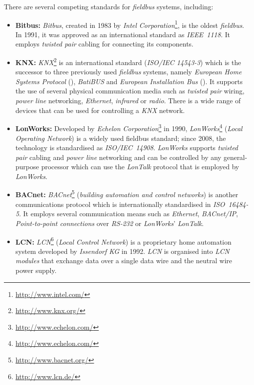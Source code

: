 There are several competing standards for \emph{fieldbus} systems, including:
\begin{itemize}
  \item \textbf{Bitbus:} \emph{Bitbus}, created in 1983 by \emph{Intel Corporation}\footnote{\href{http://www.intel.com/}{http://www.intel.com/}}, is the oldest \emph{fieldbus}. In 1991, it was approved as an international standard as \emph{IEEE~1118}\cite{IEEE1118}. It employs \emph{twisted pair} cabling for connecting its components.
  
  \item \textbf{KNX:} \emph{KNX}\footnote{\href{http://www.knx.org/}{http://www.knx.org/}} is an international standard (\emph{ISO/IEC 14543-3}\cite{knx_standard}) which is the successor to three previously used \emph{fieldbus} systems, namely \emph{European Home Systems Protocol} (), \emph{BatiBUS} and \emph{European Installation Bus} (). It supports the use of several physical communication media such as \emph{twisted pair} wiring, \emph{power line} networking, \emph{Ethernet}, \emph{infrared} or \emph{radio}. There is a wide range of devices that can be used for controlling a \emph{KNX} network.
  
  \item \textbf{LonWorks:} Developed by \emph{Echelon Corporation}\footnote{\href{http://www.echelon.com/}{http://www.echelon.com/}} in 1990, \emph{LonWorks}\footnote{\href{http://www.echelon.com/}{http://www.echelon.com/}} (\emph{Local Operating Network}) is a widely used fieldbus standard; since 2008, the technology is standardised as \emph{ISO/IEC~14908}\cite{ISO14908}. \emph{LonWorks} supports \emph{twisted pair} cabling and \emph{power line} networking and can be controlled by any general-purpose processor which can use the \emph{LonTalk} protocol that is employed by \emph{LonWorks}.
  
  \item \textbf{BACnet:} \emph{BACnet}\footnote{\href{http://www.bacnet.org/}{http://www.bacnet.org/}} (\emph{building automation and control networks}) is another communications protocol which is internationally standardised in \emph{ISO~16484-5}\cite{ISO16484}. It employs several communication means such as \emph{Ethernet}, \emph{BACnet/IP}, \emph{Point-to-point connections} over \emph{RS-232} or \emph{LonWorks}' \emph{LonTalk}.
  
  \item \textbf{LCN:} \emph{LCN}\footnote{\href{http://www.lcn.de/}{http://www.lcn.de/}} (\emph{Local Control Network}) is a proprietary home automation system developed by \emph{Issendorf KG} in 1992. \emph{LCN} is organised into \emph{LCN modules} that exchange data over a single data wire and the neutral wire power supply.
\end{itemize}

